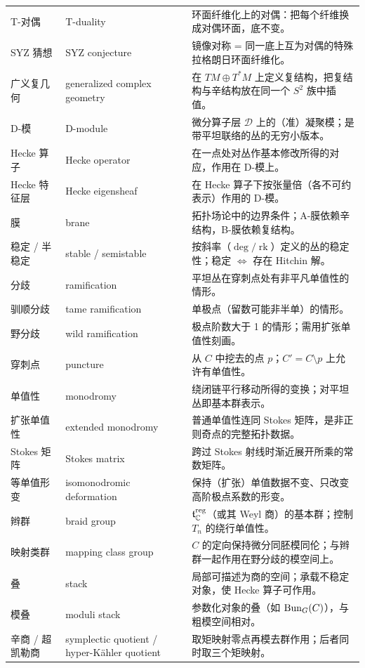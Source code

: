 \begin{longtable}{p{}p{}p{}}
T-对偶 & T-duality & 环面纤维化上的对偶：把每个纤维换成对偶环面，底不变。 \\
SYZ 猜想 & SYZ conjecture & 镜像对称 = 同一底上互为对偶的特殊拉格朗日环面纤维化。 \\
广义复几何 & generalized complex geometry & 在 $TM\oplus T^{*}M$ 上定义复结构，把复结构与辛结构放在同一个 $S^{2}$ 族中插值。 \\
D-模 & D-module & 微分算子层 $\mathcal{D}$ 上的（准）凝聚模；是带平坦联络的丛的无穷小版本。 \\
Hecke 算子 & Hecke operator & 在一点处对丛作基本修改所得的对应，作用在 D-模上。 \\
Hecke 特征层 & Hecke eigensheaf & 在 Hecke 算子下按张量倍（各不可约表示）作用的 D-模。 \\
膜 & brane & 拓扑场论中的边界条件；A-膜依赖辛结构，B-膜依赖复结构。 \\
稳定 / 半稳定 & stable / semistable & 按斜率（$\deg/\operatorname{rk}$）定义的丛的稳定性；稳定 $\Leftrightarrow$ 存在 Hitchin 解。 \\
分歧 & ramification & 平坦丛在穿刺点处有非平凡单值性的情形。 \\
驯顺分歧 & tame ramification & 单极点（留数可能非半单）的情形。 \\
野分歧 & wild ramification & 极点阶数大于 1 的情形；需用扩张单值性刻画。 \\
穿刺点 & puncture & 从 $C$ 中挖去的点 $p$；$C'=C\setminus p$ 上允许有单值性。 \\
单值性 & monodromy & 绕闭链平行移动所得的变换；对平坦丛即基本群表示。 \\
扩张单值性 & extended monodromy & 普通单值性连同 Stokes 矩阵，是非正则奇点的完整拓扑数据。 \\
Stokes 矩阵 & Stokes matrix & 跨过 Stokes 射线时渐近展开所乘的常数矩阵。 \\
等单值形变 & isomonodromic deformation & 保持（扩张）单值数据不变、只改变高阶极点系数的形变。 \\
辫群 & braid group & $\mathfrak{t}_{\mathbb{C}}^{\mathrm{reg}}$（或其 Weyl 商）的基本群；控制 $T_{n}$ 的绕行单值性。 \\
映射类群 & mapping class group & $C$ 的定向保持微分同胚模同伦；与辫群一起作用在野分歧的模空间上。 \\
叠 & stack & 局部可描述为商的空间；承载不稳定对象，使 Hecke 算子可作用。 \\
模叠 & moduli stack & 参数化对象的叠（如 $\mathrm{Bun}_{G}(C)$），与粗模空间相对。 \\
辛商 / 超凯勒商 & symplectic quotient / hyper-Kähler quotient & 取矩映射零点再模去群作用；后者同时取三个矩映射。 \\

\end{longtable}
